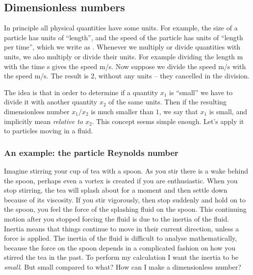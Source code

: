 \documentclass[thesis.tex]{subfiles}
\begin{document}
\subsection*{Dimensionless numbers}

In principle all physical quantities have some units. For example, the size of a particle has units of ``length'', and the speed of the particle has units of ``length per time'', which we write as . Whenever we multiply or divide quantities with units, we also multiply or divide their units. For example dividing the length \unit[20]{m} with the time \unit[5]{s} gives the speed \unit[4]{m/s}. Now suppose we divide the speed \unit[4]{m/s} with the speed \unit[2]{m/s}. The result is $2$, without any units -- they cancelled in the division.

The idea is that in order to determine if a quantity $x_1$ is ``small'' we have to divide it with another quantity $x_2$ of the same units. Then if the resulting dimensionless number $x_1/x_2$ is much smaller than $1$, we say that $x_1$ is small, and implicitly mean \emph{relative to $x_2$}. This concept seems simple enough. Let's apply it to particles moving in a fluid.

\subsubsection*{An example: the particle Reynolds number}

Imagine stirring your cup of tea with a spoon. As you stir there is a wake behind the spoon, perhaps even a vortex is created if you are enthusiastic. When you stop stirring, the tea will splash about for a moment and then settle down because of its viscosity. If you stir vigorously, then stop suddenly and hold on to the spoon, you feel the force of the splashing fluid on the spoon. This continuing motion after you stopped forcing the fluid is due to the inertia of the fluid. Inertia means that things continue to move in their current direction, unless a force is applied. The inertia of the fluid is difficult to analyse mathematically, because the force on the spoon depends in a complicated fashion on how you stirred the tea in the past. To perform my calculation I want the inertia to be \emph{small}. But small compared to what? How can I make a dimensionless number?
\end{document}
